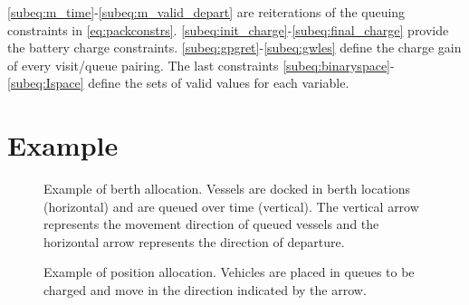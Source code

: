 \documentclass[ee,thesis]{usuthesis}
\begin{document}
\autoref{subeq:m_time}-\autoref{subeq:m_valid_depart} are reiterations of the queuing constraints in
\autoref{eq:packconstrs}. \autoref{subeq:init_charge}-\autoref{subeq:final_charge} provide the battery charge
constraints. \autoref{subeq:gpgret}-\autoref{subeq:gwles} define the charge gain of every visit/queue pairing. The last
constraints \autoref{subeq:binaryspace}-\autoref{subeq:Ispace} define the sets of valid values for each variable.

\section{Example}
\label{sec:milp-example}
\begin{subfigures}
    \begin{figure}[htpb]
    \centering
        
        \caption{Example of berth allocation. Vessels are docked in berth locations (horizontal) and are queued over
          time (vertical). The vertical arrow represents the movement direction of queued vessels and the horizontal
          arrow represents the direction of departure.}
        \label{subfig:bapexample}
    \end{figure}
    \hfill

    \begin{figure}[htpb]
    \centering
        
        \caption{Example of position allocation. Vehicles are placed in queues to be charged and move in the direction
          indicated by the arrow.}
        \label{subfig:papexample}
    \end{figure}
\end{subfigures}
\end{document}

